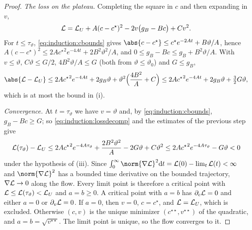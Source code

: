\begin{refsection}
\begin{proof}
\emph{The loss on the plateau.} Completing the square in $c$ and then expanding in $v$,
\begin{equation}\label{eq:induction:lossdecomp}
  \mathcal{L}=\mathcal{L}_{U}+A(c-c^\star)^2-2v\bigl(g_B-Bc\bigr)+Cv^2 .
\end{equation}
For $t\le\tau_\vartheta$, \eqref{eq:induction:cbounds} gives $\abs{c-c^\star}\le c^\star e^{-2At}+B\vartheta/A$, hence $A(c-c^\star)^2\le2A{c^\star}^2e^{-4At}+2B^2\vartheta^2/A$, and $0\le g_B-Bc\le g_B+B^2\vartheta/A$. With $v\le\vartheta$, $C\vartheta\le G/2$, $4B^2\vartheta/A\le G$ (both from $\vartheta\le\vartheta_0$) and $G\le g_B$,
\[
  \abs{\Loss-\indLU}\le2A{c^\star}^2e^{-4At}+2g_B\vartheta+\vartheta^2\Bigl(\frac{4B^2}A+C\Bigr)\le2A{c^\star}^2e^{-4At}+2g_B\vartheta+\tfrac32G\vartheta,
\]
which is at most the bound in (i).

\emph{Convergence.} At $t=\tau_\vartheta$ we have $v=\vartheta$ and, by \eqref{eq:induction:cbounds}, $g_B-Bc\ge G$; so \eqref{eq:induction:lossdecomp} and the estimates of the previous step give
\[
  \mathcal{L}(\tau_\vartheta)-\mathcal{L}_{U}\le2A{c^\star}^2e^{-4A\tau_\vartheta}+\frac{2B^2\vartheta^2}A-2G\vartheta+C\vartheta^2\le2A{c^\star}^2e^{-4A\tau_\vartheta}-G\vartheta<0
\]
under the hypothesis of (iii). Since $\int_0^\infty\norm{\nabla\Loss}^2\mathrm dt=\Loss(0)-\lim_t\Loss(t)<\infty$ and $\norm{\nabla\Loss}^2$ has a bounded time derivative on the bounded trajectory, $\nabla\mathcal{L}\to0$ along the flow. Every limit point is therefore a critical point with $\mathcal{L}\le\mathcal{L}(\tau_\vartheta)<\mathcal{L}_{U}$ and $a=b\ge0$. A critical point with $a=b$ has $\partial_c\mathcal{L}=0$ and either $a=0$ or $\partial_v\mathcal{L}=0$. If $a=0$, then $v=0$, $c=c^\star$, and $\mathcal{L}=\mathcal{L}_{U}$, which is excluded. Otherwise $(c,v)$ is the unique minimizer $(c^{\star\star},v^{\star\star})$ of the quadratic, and $a=b=\sqrt{v^{\star\star}}$. The limit point is unique, so the flow converges to it.
\end{proof}

\begin{corollary}[Logarithmic escape]\label[corollary]{cor:induction:log}
Under the hypotheses of \cref{thm:induction:escape}, for every fixed $\vartheta\in(0,\vartheta_0]$,
\begin{gather*}
  \frac1{2(G+\indAX^2\vartheta/\indAU)}\le\liminf_{\alpha\to0}\frac{\tau_\vartheta}{\log(1/\alpha)},\\
  \limsup_{\alpha\to0}\frac{\tau_\vartheta}{\log(1/\alpha)}\le\frac1{2(G-\indAB\vartheta)} .
\end{gather*}
\end{corollary}


\end{refsection}
